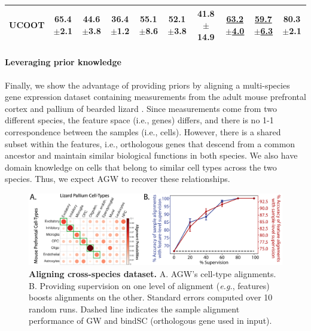 \begin{table}[ht]
\begin{center}
{\begin{tabular}{@{}lccccccccc@{}}
\textbf{UCOOT} & 65.4$\pm$2.1                              & 44.6$\pm$3.8                               & 36.4$\pm$1.2                               & 55.1$\pm$8.6                               & 52.1$\pm$3.8                               & 41.8$\pm$14.9                              & \underline{63.2$\pm$4.0}                               & \underline{59.7$\pm$6.3}                               & 80.3$\pm$2.1                               \\
\bottomrule
\end{tabular}}
\end{center}
\end{table}

\paragraph{Leveraging prior knowledge}
Finally, we show the advantage of providing priors by aligning a
multi-species gene expression dataset containing measurements from
the adult mouse prefrontal cortex \citep{mouse} and pallium of bearded lizard \citep{lizard}.
Since measurements come from two different species, the feature space (i.e., genes) differs,
and there is no 1-1 correspondence between the samples (i.e., cells). However,
there is a shared subset within the features, i.e., orthologous genes that
descend from a common ancestor and maintain similar biological functions in both species.
We also have domain knowledge on cells that belong to similar cell types across the two species.
Thus, we expect AGW to recover these relationships.

\setlength{\columnsep}{10pt}%
\setlength{\intextsep}{0pt}
\begin{figure}[!t]
\centering
\includegraphics[width=0.85\linewidth]{./Chapitre5/fig/xSp_full.png}
\caption{\label{fig:xsp} \textbf{Aligning cross-species dataset.}
A. AGW's cell-type alignments.
B. Providing supervision on one level of alignment (\textit{e.g.}, features)
boosts alignments on the other. Standard errors computed over 10 random runs.
Dashed line indicates the sample alignment performance of GW and bindSC
(orthologous gene used in input).}
\end{figure}


